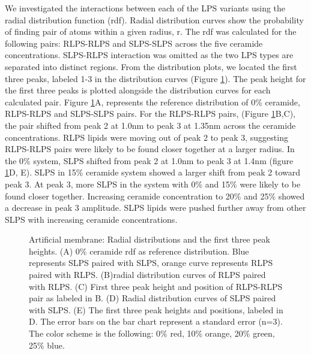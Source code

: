 \documentclass[10pt, letterpaper]{article}
\begin{document}

We investigated the interactions between each of the LPS variants using the radial distribution function (rdf). Radial distribution curves show the probability of finding pair of atoms within a given radius, r. The rdf was calculated for the following pairs: RLPS-RLPS and SLPS-SLPS across the five ceramide concentrations. SLPS-RLPS interaction was omitted as the two LPS types are separated into distinct regions. 
From the distribution plots, we located the first three peaks, labeled 1-3 in the distribution curves (Figure \ref{fig:art_radial_dist}). The peak height for the first three peaks is plotted alongside the distribution curves for each calculated pair. Figure \ref{fig:art_radial_dist}A, represents the reference distribution of 0\% ceramide, RLPS-RLPS and SLPS-SLPS pairs. For the RLPS-RLPS pairs, (Figure \ref{fig:art_radial_dist}B,C), the pair shifted from peak 2 at 1.0nm to peak 3 at 1.35nm across the ceramide concentrations. RLPS lipids were moving out of peak 2 to peak 3, suggesting RLPS-RLPS pairs were likely to be found closer together at a larger radius. In the 0\% system, SLPS shifted from peak 2 at 1.0nm to peak 3 at 1.4nm (figure \ref{fig:art_radial_dist}D, E). SLPS in 15\% ceramide system showed a larger shift from peak 2 toward peak 3. At peak 3, more SLPS in the system with 0\% and 15\% were likely to be found closer together. Increasing ceramide concentration to 20\% and 25\% showed a decrease in peak 3 amplitude. SLPS lipids were pushed further away from other SLPS with increasing ceramide concentrations.


\begin{figure}[H]
  \centering
  \qquad
  \qquad
  \caption[Artificial Membrane: Radial Distribution Function]{Artificial membrane: Radial distributions and the first three peak heights. (A) 0\% ceramide rdf as reference distribution. Blue represents SLPS paired with SLPS, orange curve represents RLPS paired with RLPS. 
  (B)radial distribution curves of RLPS paired with RLPS. (C) First three peak height and position of RLPS-RLPS pair as labeled in B. (D) Radial distribution curves of SLPS paired with SLPS. (E) The first three peak heights and positions, labeled in D. The error bars on the bar chart represent a standard error (n=3). The color scheme is the following: 0\% red, 10\% orange, 20\% green, 25\% blue.
  }\label{fig:art_radial_dist}
\end{figure}
\end{document}
